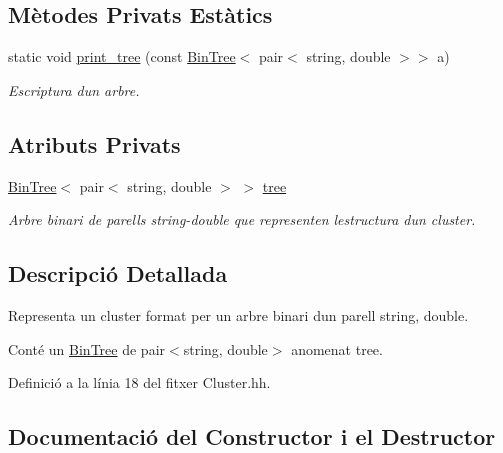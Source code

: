 \subsection*{Mètodes Privats Estàtics}
\begin{DoxyCompactItemize}
\item 
static void \hyperlink{class_cluster_a8343114bf709fe49b69c686919d54251}{print\+\_\+tree} (const \hyperlink{class_bin_tree}{Bin\+Tree}$<$ pair$<$ string, double $>$$>$ a)
\begin{DoxyCompactList}\small\item\em Escriptura d\textquotesingle{}un arbre. \end{DoxyCompactList}\end{DoxyCompactItemize}
\subsection*{Atributs Privats}
\begin{DoxyCompactItemize}
\item 
\hyperlink{class_bin_tree}{Bin\+Tree}$<$ pair$<$ string, double $>$ $>$ \hyperlink{class_cluster_a3bfc63bfed216dd410ec687fe533c34c}{tree}
\begin{DoxyCompactList}\small\item\em Arbre binari de parells string-\/double que representen l\textquotesingle{}estructura d\textquotesingle{}un cluster. \end{DoxyCompactList}\end{DoxyCompactItemize}


\subsection{Descripció Detallada}
Representa un cluster format per un arbre binari d\textquotesingle{}un parell string, double. 

Conté un \hyperlink{class_bin_tree}{Bin\+Tree} de pair$<$string, double$>$ anomenat tree. 

Definició a la línia 18 del fitxer Cluster.\+hh.



\subsection{Documentació del Constructor i el Destructor}
\mbox{\label{class_cluster_aee7feb1d599d4c8fda6c3ee83e86ba81}} 
